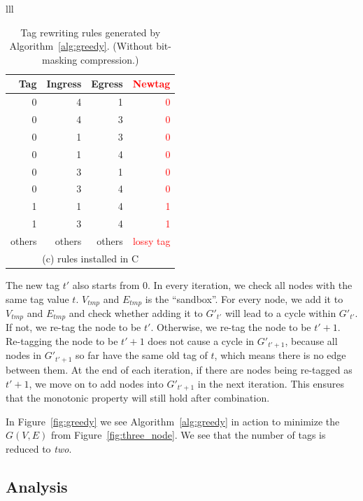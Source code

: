 \begin{table}[t]
\begin{tabular}{lll}
		\begin{tabular}{|r|r|r|r|}
			\hline
			Tag&  Ingress& Egress & \textcolor{red}{Newtag} \\
			\hline
			\hline
			0 & 4 & 1 & \textcolor{red}{0} \\
			\hline
			0 & 4 & 3 & \textcolor{red}{0} \\
			\hline
			0 & 1 & 3 & \textcolor{red}{0} \\
			\hline
			0 & 1 & 4 & \textcolor{red}{0} \\
			\hline
			0 & 3 & 1 & \textcolor{red}{0} \\
			\hline
			0 & 3 & 4 & \textcolor{red}{0} \\
			\hline
			1 & 1 & 4 & \textcolor{red}{1} \\
			\hline
			1 & 3 & 4 & \textcolor{red}{1} \\
			\hline
			others & others & others & \textcolor{red}{lossy tag} \\
			\hline
			\multicolumn{4}{c}{(c) rules installed in C} \\
		\end{tabular}
		
	\end{tabular}
	\caption{Tag rewriting rules generated by Algorithm~\ref{alg:greedy}.  (Without bit-masking compression.)}
	\label{table:tagging_table2}
\end{table}

The new tag $t'$ also starts from 0. In every iteration, we check all nodes with
the same tag value $t$. $V_{tmp}$ and $E_{tmp}$ is the ``sandbox''. For every
node, we add it to $V_{tmp}$ and $E_{tmp}$ and check whether adding it to
$G'_{t'}$ will lead to a cycle within $G'_{t'}$. If not, we re-tag the node to
be $t'$. Otherwise, we re-tag the node to be $t'+1$.  Re-tagging the node to be
$t'+1$ does not cause a cycle in $G'_{t'+1}$, because all nodes in $G'_{t'+1}$
so far have the same old tag of $t$, which means there is no edge between them.
At the end of each iteration, if there are nodes being re-tagged as $t'+1$, we
move on to add nodes into $G'_{t'+1}$ in the next iteration.  This ensures that
the monotonic property will still hold after combination.

In Figure~\ref{fig:greedy} we see Algorithm~\ref{alg:greedy} in action to
minimize the $G(V,E)$ from Figure~\ref{fig:three_node}. We see that the number
of tags is reduced to {\em two}.

\subsection {Analysis}
\label{subsec:caveats}

